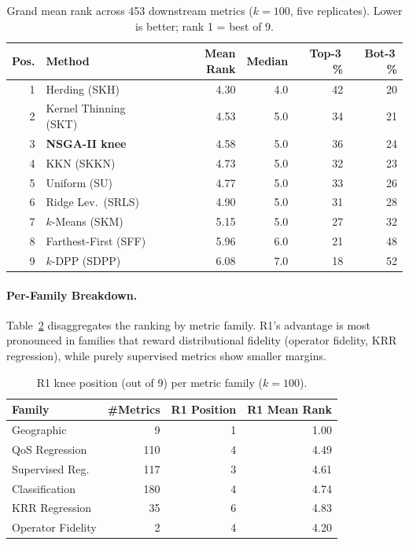 \documentclass[10pt,journal]{IEEEtran}
\newcommand{\1}{\mathbf{1}}
\theoremstyle{ieeethm}
\begin{document}
\begin{table}[t]
\centering
\caption{Grand mean rank across 453 downstream metrics ($k=100$, five replicates).
Lower is better; rank 1 = best of 9.}
\label{tab:baseline_mean_rank}
\small
\begin{tabular}{@{}r l r r r r@{}}
\toprule
Pos. & Method & Mean Rank & Median & Top-3\,\% & Bot-3\,\% \\
\midrule
1 & Herding (SKH)        & 4.30 & 4.0 & 42 & 20 \\
2 & Kernel Thinning (SKT)& 4.53 & 5.0 & 34 & 21 \\
3 & \textbf{NSGA-II knee}& 4.58 & 5.0 & 36 & 24 \\
4 & KKN (SKKN)           & 4.73 & 5.0 & 32 & 23 \\
5 & Uniform (SU)         & 4.77 & 5.0 & 33 & 26 \\
6 & Ridge Lev.\ (SRLS)   & 4.90 & 5.0 & 31 & 28 \\
7 & $k$-Means (SKM)      & 5.15 & 5.0 & 27 & 32 \\
8 & Farthest-First (SFF) & 5.96 & 6.0 & 21 & 48 \\
9 & $k$-DPP (SDPP)       & 6.08 & 7.0 & 18 & 52 \\
\bottomrule
\end{tabular}
\end{table}

\paragraph{Per-Family Breakdown.}
Table~\ref{tab:baseline_per_family} disaggregates the ranking by metric family. R1's
advantage is most pronounced in families that reward distributional fidelity (operator
fidelity, KRR regression), while purely supervised metrics show smaller margins.

\begin{table}[t]
\centering
\caption{R1 knee position (out of 9) per metric family ($k=100$).}
\label{tab:baseline_per_family}
\small
\begin{tabular}{@{}l r r r@{}}
\toprule
Family & \#Metrics & R1 Position & R1 Mean Rank \\
\midrule
Geographic          &   9 & 1 & 1.00 \\
QoS Regression      & 110 & 4 & 4.49 \\
Supervised Reg.     & 117 & 3 & 4.61 \\
Classification      & 180 & 4 & 4.74 \\
KRR Regression      &  35 & 6 & 4.83 \\
Operator Fidelity   &   2 & 4 & 4.20 \\
\bottomrule
\end{tabular}
\end{table}
\end{document}
